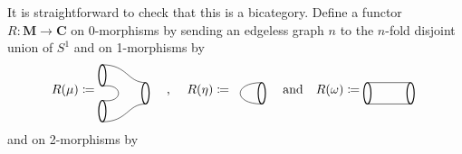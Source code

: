\documentclass[11pt]{amsart}
\newcommand{\cat}[1]{\mathbf{#1}}
\renewcommand{\t}[1]{\textup{#1}}
\newcommand{\from}{\colon}
\theoremstyle{remark}
\theoremstyle{definition}
\begin{document}
It is straightforward to check 
that this is a bicategory. 
Define a functor 
	$R \from \cat{M} \to \cat{C}$ on 
0-morphisms by sending an 
edgeless graph $n$ to the 
$n$-fold disjoint union of $S^1$ and 
on 1-morphisms by 
\[
R(\mu) \coloneqq
\raisebox{-0.5\height}{%
	\begin{tikzpicture}
		\draw [thick]  (1.6,-0.2) ellipse (0.1 and 0.3);
	\draw [thick]  (0.4,0.3) ellipse (0.1 and 0.3);
	\draw [thick] (0.4,-0.7) ellipse (0.1 and 0.3);
	\draw (0.4,0) .. controls (1,0.1) and (1,-0.5) .. (0.4,-0.4);
	\draw (0.4,0.6) .. controls (1.1,0.6) and (1.1,0.1) .. (1.6,0.1);
	\draw (0.4,-1) .. controls (1.1,-1) and (1.1,-0.5) .. (1.6,-0.5);
	\end{tikzpicture}
}
	\quad
	\t{, }
	\quad
R(\eta) \coloneqq
\raisebox{-0.5\height}{%
	\begin{tikzpicture}
	\draw [thick]  (0,0) ellipse (0.1 and 0.3);
	\draw (0,0.3) .. controls (-0.8,0.3) and (-0.8,-0.3) .. (0,-0.3);
	\end{tikzpicture}
}
%
%
%
\quad
\t{and}
\quad
%
%
%
R(\omega) \coloneqq
\raisebox{-0.5\height}{%
	\begin{tikzpicture}
	\draw [thick]  (1.6,-0.2) ellipse (0.1 and 0.3);
	\draw [thick] (0.4,-0.2) ellipse (0.1 and 0.3);
	\draw (0.4,0.1) -- (1.6,0.1);
	\draw (0.4,-0.5) -- (1.6,-0.5);
	\end{tikzpicture}
}
\]
and on 2-morphisms by 
\end{document}

